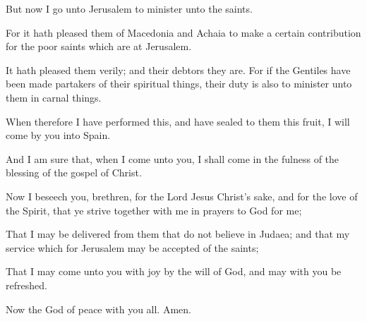 {But
now I
go
unto
Jerusalem to
minister unto the
saints.

For it hath pleased
them of
Macedonia
and
Achaia to
make
a
certain
contribution
for the
poor
saints which
are
at
Jerusalem.

It hath pleased
them
verily;
and
their
debtors they
are.
For
if the
Gentiles have been made partakers
of
their spiritual
things, their duty
is
also to
minister unto
them
in carnal
things.

When
therefore I have
performed
this,
and have
sealed to
them
this
fruit, I will
come
by
you
into
Spain.

And I am
sure
that, when I
come
unto
you, I shall
come
in the
fulness of the
blessing of the
gospel of
Christ.


\par }{\PP {}Now I
beseech
you,
brethren, for
the
Lord
Jesus
Christ’s
sake,
and
for the
love of the
Spirit, that ye strive
together with
me
in
{}
prayers
to
God
for
me;

That I may be
delivered
from them that do not
believe
in
Judaea;
and
that
my
service
which
{}
for
Jerusalem may
be
accepted of the
saints;

That I may
come
unto
you
with
joy
by the
will of
God,
and may
with
you be
refreshed.

Now the
God of
peace
{}
with
you
all.
Amen.




\par }
